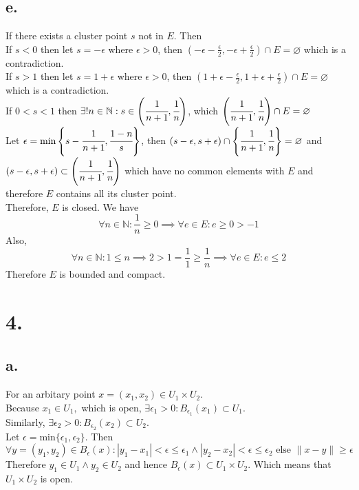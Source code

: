 \documentclass[11pt]{article}
\begin{document}
\subsection*{e.}
If there exists a cluster point $s$ not in $E$. Then \\
If $s < 0$ then let $s = -\epsilon$ where $\epsilon>0$, then $\left(-\epsilon - \frac{\epsilon}{2} , -\epsilon + \frac{\epsilon}{2} \right) \cap E = \varnothing$ which is a contradiction. \\
If $s > 1$ then let $s = 1+ \epsilon$ where $\epsilon>0$, then $\left(1 + \epsilon - \frac{\epsilon}{2} , 1 + \epsilon + \frac{\epsilon}{2} \right) \cap E = \varnothing$ which is a contradiction. \\ 
If $0<s<1$ then $\exists ! n \in \mathbb{N}: s \in \left(\cfrac{1}{n+1},\cfrac{1}{n} \right)$, which $\left(\cfrac{1}{n+1},\cfrac{1}{n} \right) \cap E = \varnothing$ \\
Let $\epsilon = \text{min}\left\{s-\cfrac{1}{n+1}, \cfrac{1-n}{s}\right\}$, then $(s-\epsilon, s+ \epsilon) \cap \left\{\cfrac{1}{n+1},\cfrac{1}{n} \right\}= \varnothing$ and $(s-\epsilon, s+ \epsilon) \subset \left(\cfrac{1}{n+1},\cfrac{1}{n} \right) $ which have no common elements with $E$ and therefore $E$ contains all its cluster point.\\
Therefore, $E$ is closed. 
We have \\
\[\forall n \in \mathbb{N}: \frac{1}{n} \ge 0  \implies \forall e \in E: e \ge 0 > -1 \]
Also, \\
\[\forall n \in \mathbb{N}: 1 \le n \implies 2 > 1 = \frac{1}{1} \ge \frac{1}{n} \implies \forall e \in E: e \le 2\]
Therefore $E$ is bounded and compact. 
\pagebreak
\section*{4.}
\subsection*{a.}
For an arbitary point $x = (x_1, x_2) \in U_1 \times U_2$. \\
Because $x_1 \in U_1,$ which is open, $\exists \epsilon_1 > 0: B_{\epsilon_1}(x_1) \subset U_1$.\\
Similarly, $\exists \epsilon_2 > 0: B_{\epsilon_2}(x_2) \subset U_2$.\\
Let $\epsilon = \text{min}\{\epsilon_1 , \epsilon_2\}$. Then
\[ 
\forall y = (y_1, y_2) \in B_\epsilon(x): |y_1 - x_1| < \epsilon \le \epsilon_1\land |y_2 - x_2| < \epsilon \le \epsilon_2 \text{ else } \|x-y\| \ge \epsilon 
\]
Therefore $y_1 \in U_1 \land y_2 \in U_2$ and hence $B_\epsilon(x) \subset U_1 \times U_2$. Which means that $U_1 \times U_2$ is open.
\end{document}
